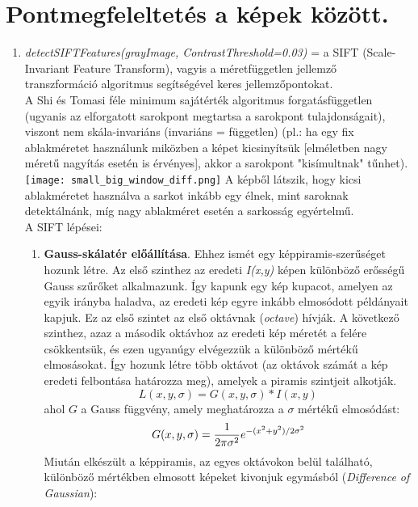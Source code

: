 \documentclass[12pt]{report}
\begin{document}
            \section{Pontmegfeleltetés a képek között.}
                \begin{enumerate}
                    \item \textit{detectSIFTFeatures(grayImage, ContrastThreshold=0.03)} = a SIFT (Scale-Invariant Feature Transform), vagyis a méretfüggetlen jellemző transzformáció algoritmus segítségével keres jellemzőpontokat.\\
                        A Shi és Tomasi féle minimum sajátérték algoritmus forgatásfüggetlen (ugyanis az elforgatott sarokpont megtartsa a sarokpont tulajdonságait), viszont nem skála-invariáns (invariáns = független) (pl.: ha egy fix ablakméretet használunk miközben a képet kicsinyítsük [elméletben nagy méretű nagyítás esetén is érvényes], akkor a sarokpont "kisímultnak" tűnhet).\\
                        \texttt{[image: small\_big\_window\_diff.png]}
                        A képből látszik, hogy kicsi ablakméretet használva a sarkot inkább egy élnek, mint saroknak detektálnánk, míg nagy ablakméret esetén a sarkosság egyértelmű.\\
                        A SIFT lépései:\\
                            \begin{enumerate}
                                \item \textbf{Gauss-skálatér előállítása}. Ehhez ismét egy képpiramis-szerűséget hozunk létre. Az első szinthez az eredeti \textit{I(x,y)} képen különböző erősségű Gauss szűrőket alkalmazunk. Így kapunk egy kép kupacot, amelyen az egyik irányba haladva, az eredeti kép egyre inkább elmosódott példányait kapjuk. Ez az első szintet az első oktávnak (\textit{octave}) hívják. A következő szinthez, azaz a második oktávhoz az eredeti kép méretét a felére csökkentsük, és ezen ugyanúgy elvégezzük a különböző mértékű elmosásokat. Így hozunk létre több oktávot (az oktávok számát a kép eredeti felbontása határozza meg), amelyek a piramis szintjeit alkotják.\\
                                    \[L(x,y,\sigma) = G(x,y,\sigma) * I(x,y)\]
                                    ahol $G$ a Gauss függvény, amely meghatározza a $\sigma$ mértékű elmosódást:
                                    \[G(x,y,\sigma) = {1\over2\pi \sigma ^2}e^{-(x^2+y^2)/2\sigma^2}\]
                                    Miután elkészült a képpiramis, az egyes oktávokon belül található, különböző mértékben elmosott képeket kivonjuk egymásból (\textit{Difference of Gaussian}):\\

\end{enumerate}
\end{enumerate}
\end{document}
